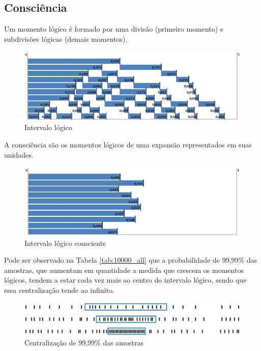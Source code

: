 \subsection{Consciência}
Um momento lógico é formado por uma divisão (primeiro momento) e subdivisões lógicas (demais momentos).
	\begin{figure}[H]
	\caption{Intervalo lógico}
	\label{fig:consciousness_logical_moments}
	\centering
	\includegraphics[scale=.7]{sections/images/consciousness_logical_moments.jpg}
	\end{figure}

A consciência são os momentos lógicos de uma expansão representados em suas unidades.
	\begin{figure}[H]
	\caption{Intervalo lógico consciente}
	\label{fig:consciousness}
	\centering
	\includegraphics[scale=.7]{sections/images/consciousness.jpg}
	\end{figure}

Pode ser observado na Tabela \ref{tab:10000_all} que a probabilidade de 99,99\% das amostras, que aumentam em quantidade a medida que crescem os momentos lógicos, tendem a estar cada vez mais ao centro do intervalo lógico, sendo que essa centralização tende ao infinito.
	\begin{figure}[H]
	\caption{Centralização de 99,99\% das amostras}
	\label{fig:centering_of_99_range}
	\centering
	\includegraphics[scale=1]{sections/images/centering_of_99_range.jpg}
	\end{figure}

